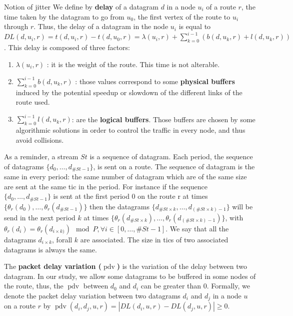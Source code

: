 \documentclass[10pt]{article}
\DeclareMathOperator{\pdv}{pdv}
\begin{document}
  \begin{subsubsection}{Notion of jitter}
   We define by {\bf delay} of a datagram $d$ in a node $u_i$ of a route $r$, the time taken by the datagram to go from $u_0$, the first vertex of the route to $u_i$ through $r$.
 Thus, the delay of a datagram in the node $u_i$ is equal to $DL(d,u_i,r) =  t(d,u_i,r) - t(d,u_0,r) = \lambda(u_i,r) + \sum_{k=0}^{i-1}( b(d,u_k,r) + l(d,u_k,r))$.
This delay is composed of three factors:
\begin{enumerate}
\item $\lambda(u_i,r)$ : it is the weight of the route. This time is not alterable. 
\item  $\sum_{k=0}^{i-1} b(d,u_k,r)$ : those values correspond to some {\bf physical buffers } induced by the potential speedup or slowdown of the different links of the route used.
\item $\sum_{k=0}^{i-1} l(d,u_k,r)$: are the {\bf logical buffers}. Those buffers are chosen by some algorithmic solutions in order to control the traffic in every node, and thus avoid collisions.
\end{enumerate}

As a reminder, a stream $St$ is a sequence of datagram. Each period, the sequence of datagrams $\{d_0,\ldots,d_{\#St-1}\}$, is sent on a route. The sequence of datagram is the same in every period: the same number of datagram which are of the same size are sent at the same tic in the period. For instance if the sequence $\{d_0,\ldots,d_{\#St-1}\}$ is sent at the first period $0$ on the route r at times $\{\theta_r(d_0),\ldots,\theta_r(d_{\#St-1})\}$ then the datagrams $\{d_{\#St \times k},\ldots,d_{(\#St \times k)-1}\}$ will be send in the next period $k$ at times $\{\theta_r(d_{\#St \times k}),\ldots,\theta_r(d_{(\#St \times k)-1})\}$, with $\theta_r(d_i) = \theta_r(d_{i \times k)}) \mod P, \forall i \in [0,\ldots,\#St-1]$. We say that all the datagrams $d_{i \times k}$, forall $k$ are associated. The size in tics of two associated datagrams is always the same. 

The {\bf packet delay variation ($\pdv$) }\cite{demichelis_ip_nodate} is the variation of the delay between two datagram. In our study, we allow some datagrams to be buffered in some nodes of the route, thus, the $\pdv$ between $d_0$ and $d_i$ can be greater than $0$. Formally, we denote the packet delay variation between two datagrams $d_i$ and $d_j$ in a node $u$ on a route $r$ by $\pdv(d_i,d_j,u,r) = |DL(d_i,u,r) - DL(d_j,u,r) | \ge 0$. 


\end{subsubsection}
\end{document}
